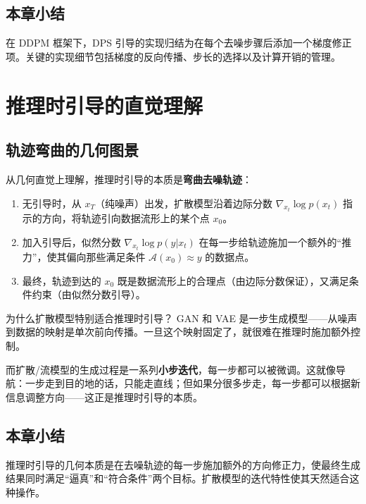 \documentclass[a4paper]{article}
\begin{document}
\subsection{本章小结}

在 DDPM 框架下，DPS 引导的实现归结为在每个去噪步骤后添加一个梯度修正项。关键的实现细节包括梯度的反向传播、步长的选择以及计算开销的管理。


\section{推理时引导的直觉理解}

\subsection{轨迹弯曲的几何图景}

从几何直觉上理解，推理时引导的本质是\textbf{弯曲去噪轨迹}：

\begin{enumerate}
    \item 无引导时，从 $x_T$（纯噪声）出发，扩散模型沿着边际分数 $\nabla_{x_t} \log p(x_t)$ 指示的方向，将轨迹引向数据流形上的某个点 $x_0$。
    \item 加入引导后，似然分数 $\nabla_{x_t} \log p(y|x_t)$ 在每一步给轨迹施加一个额外的``推力''，使其偏向那些满足条件 $\mathcal{A}(x_0) \approx y$ 的数据点。
    \item 最终，轨迹到达的 $x_0$ 既是数据流形上的合理点（由边际分数保证），又满足条件约束（由似然分数引导）。
\end{enumerate}

\begin{knowledgebox}{为什么扩散模型特别适合推理时引导？}
GAN 和 VAE 是一步生成模型——从噪声到数据的映射是单次前向传播。一旦这个映射固定了，就很难在推理时施加额外控制。

而扩散/流模型的生成过程是一系列\textbf{小步迭代}，每一步都可以被微调。这就像导航：一步走到目的地的话，只能走直线；但如果分很多步走，每一步都可以根据新信息调整方向——这正是推理时引导的本质。
\end{knowledgebox}

\subsection{本章小结}

推理时引导的几何本质是在去噪轨迹的每一步施加额外的方向修正力，使最终生成结果同时满足``逼真''和``符合条件''两个目标。扩散模型的迭代特性使其天然适合这种操作。
\end{document}
